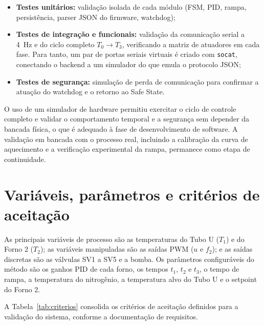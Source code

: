 \begin{itemize}
  \item \textbf{Testes unit\'arios:} valida\c{c}\~ao isolada de cada m\'odulo
  (FSM, PID, rampa, persist\^encia, parser JSON do firmware, watchdog);
  \item \textbf{Testes de integra\c{c}\~ao e funcionais:} valida\c{c}\~ao da
  comunica\c{c}\~ao serial a 4~Hz e do ciclo completo $T_0 \to T_3$, verificando
  a matriz de atuadores em cada fase. Para tanto, um par de portas seriais
  virtuais \'e criado com \texttt{socat}, conectando o backend a um simulador do
  \daq que emula o protocolo JSON;
  \item \textbf{Testes de seguran\c{c}a:} simula\c{c}\~ao de perda de
  comunica\c{c}\~ao para confirmar a atua\c{c}\~ao do watchdog e o retorno ao
  Safe State.
\end{itemize}

O uso de um simulador de hardware permitiu exercitar o ciclo de controle completo
e validar o comportamento temporal e a seguran\c{c}a sem depender da bancada
f\'isica, o que \'e adequado \`a fase de desenvolvimento de software. A
valida\c{c}\~ao em bancada com o processo real, incluindo a calibra\c{c}\~ao da
curva de aquecimento e a verifica\c{c}\~ao experimental da rampa, permanece como
etapa de continuidade.

\section{Vari\'aveis, par\^ametros e crit\'erios de aceita\c{c}\~ao}

As principais vari\'aveis de processo s\~ao as temperaturas do Tubo U ($T_1$) e
do Forno 2 ($T_2$); as vari\'aveis manipuladas s\~ao as sa\'idas PWM ($u$ e
$f_2$); e as sa\'idas discretas s\~ao as v\'alvulas SV1 a SV5 e a bomba. Os
par\^ametros configur\'aveis do m\'etodo s\~ao os ganhos PID de cada forno, os
tempos $t_1$, $t_2$ e $t_3$, o tempo de rampa, a temperatura do nitrog\^enio, a
temperatura alvo do Tubo U e o setpoint do Forno 2.

A Tabela~\ref{tab:criterios} consolida os crit\'erios de aceita\c{c}\~ao
definidos para a valida\c{c}\~ao do sistema, conforme a documenta\c{c}\~ao de
requisitos.


